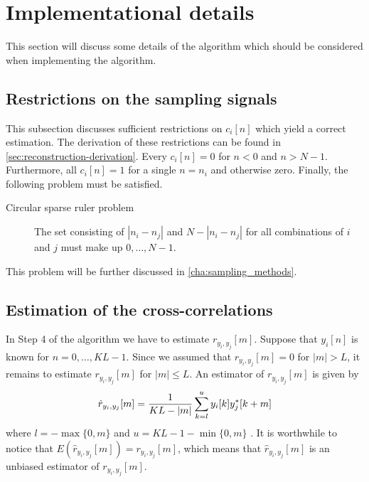 \documentclass[a4paper, openany, oneside]{memoir}
\begin{document}
\section{Implementational details}
\label{sec:reconstruction-implementation}
This section will discuss some details of the algorithm which should be considered when implementing the algorithm.

\subsection{Restrictions on the sampling signals}
\label{sub:reconstruction-ci}
This subsection discusses sufficient restrictions on $c_i[n]$ which yield a correct estimation. The derivation of these restrictions can be found in \cref{sec:reconstruction-derivation}. Every $c_i[n]=0$ for $n < 0$ and $n > N-1$. Furthermore, all $c_i[n]=1$ for a single $n=n_i$ and otherwise zero. Finally, the following problem must be satisfied.

\begin{description}
    \item[Circular sparse ruler problem] The set consisting of $|n_i - n_j|$ and $N-|n_i-n_j|$ for all combinations of $i$ and $j$ must make up $0,\ldots,N-1$.
\end{description}

This problem will be further discussed in \cref{cha:sampling_methods}.

\subsection{Estimation of the cross-correlations}
\label{sub:reconstruction-estimation}
In Step 4 of the algorithm we have to estimate $r_{y_i,y_j}[m]$. Suppose that $y_i[n]$ is known for $n = 0,\ldots,KL-1$. Since we assumed that $r_{y_i,y_j}[m]=0$ for $|m|>L$, it remains to estimate $r_{y_i,y_j}[m]$ for $|m| \le L$. An estimator of $r_{y_i,y_j}[m]$ is given by
\begin{align} \label{eq:ryij-est}
    \hat{r}_{y_i,y_j}[m] = \frac{1}{KL-|m|}\sum_{k=l}^{u}y_i[k]y^*_j[k+m]
\end{align}
where $l=-\max\{0,m\}$ and $u=KL-1-\min\{0,m\}$ \cite{hayes1996statistical}. It is worthwhile to notice that $E(\hat{r}_{y_i,y_j}[m])=r_{y_i,y_j}[m]$, which means that $\hat{r}_{y_i,y_j}[m]$ is an unbiased estimator of $r_{y_i,y_j}[m]$.
\end{document}
